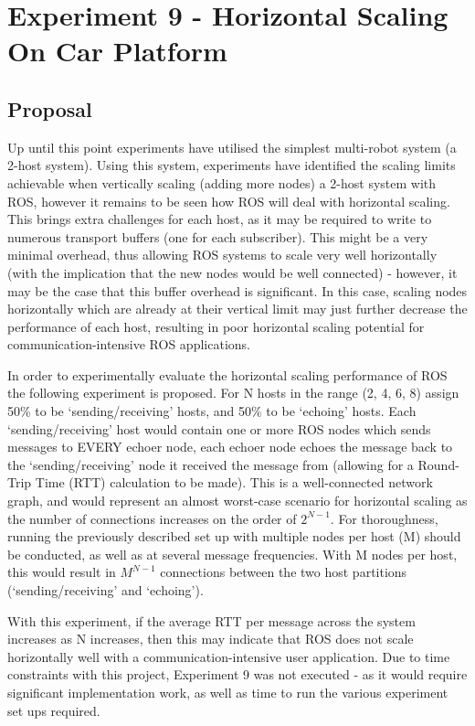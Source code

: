 \documentclass[../dissertation.tex]{subfiles}
\begin{document}
\section{Experiment 9 - Horizontal Scaling On Car Platform}
\label{experiment9-horizontal-scaling}

\subsection{Proposal}

Up until this point experiments have utilised the simplest multi-robot system (a 2-host system). Using this system, experiments have identified the scaling limits achievable when vertically scaling (adding more nodes) a 2-host system with ROS, however it remains to be seen how ROS will deal with horizontal scaling. This brings extra challenges for each host, as it may be required to write to numerous transport buffers (one for each subscriber). This might be a very minimal overhead, thus allowing ROS systems to scale very well horizontally (with the implication that the new nodes would be well connected) - however, it may be the case that this buffer overhead is significant. In this case, scaling nodes horizontally which are already at their vertical limit may just further decrease the performance of each host, resulting in poor horizontal scaling potential for communication-intensive ROS applications.

In order to experimentally evaluate the horizontal scaling performance of ROS the following experiment is proposed. For N hosts in the range (2, 4, 6, 8) assign 50\% to be `sending/receiving' hosts, and 50\% to be `echoing' hosts. Each `sending/receiving' host would contain one or more ROS nodes which sends messages to EVERY echoer node, each echoer node echoes the message back to the `sending/receiving' node it received the message from (allowing for a Round-Trip Time (RTT) calculation to be made). This is a well-connected network graph, and would represent an almost worst-case scenario for horizontal scaling as the number of connections increases on the order of $2^{N-1}$. For thoroughness, running the previously described set up with multiple nodes per host (M) should be conducted, as well as at several message frequencies. With M nodes per host, this would result in $M^{N-1}$ connections between the two host partitions (`sending/receiving' and `echoing').

With this experiment, if the average RTT per message across the system increases as N increases, then this may indicate that ROS does not scale horizontally well with a communication-intensive user application. Due to time constraints with this project, Experiment 9 was not executed - as it would require significant implementation work, as well as time to run the various experiment set ups required.
\end{document}
